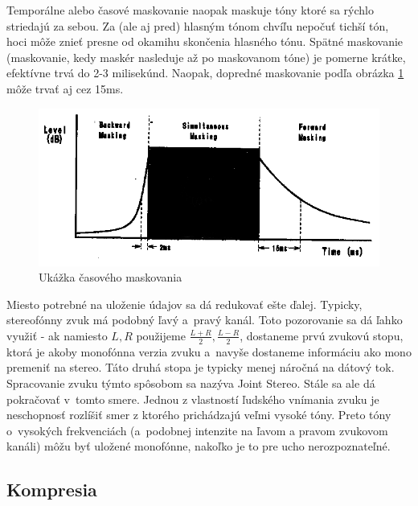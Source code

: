 Temporálne alebo časové maskovanie naopak maskuje tóny ktoré sa rýchlo
striedajú za sebou. Za (ale aj pred) hlasným tónom chvíľu nepočuť
tichší tón, hoci môže znieť presne od okamihu skončenia hlasného tónu.
Spätné maskovanie (maskovanie, kedy maskér nasleduje až po maskovanom
tóne) je pomerne krátke, efektívne trvá do 2-3 milisekúnd.
Naopak, dopredné maskovanie podľa obrázka \ref{fig:temporal_masking}
môže trvať aj cez 15ms.

\begin{figure}[htp]
    \centering
    \includegraphics{obrazky/informatika/audio/temporal_masking}
    \caption{Ukážka časového maskovania}
    \label{fig:temporal_masking}
\end{figure}

Miesto potrebné na uloženie údajov sa dá redukovať ešte ďalej.
Typicky, stereofónny zvuk má podobný ľavý a~pravý kanál. Toto
pozorovanie sa dá ľahko využiť - ak namiesto $L,R$ použijeme
$\frac{L+R}{2}, \frac{L-R}{2}$, dostaneme prvú zvukovú stopu, ktorá je
akoby monofónna verzia zvuku a~navyše dostaneme informáciu ako mono premeniť
na stereo. Táto druhá stopa je typicky menej náročná na dátový tok.
Spracovanie zvuku týmto spôsobom sa nazýva Joint Stereo.
Stále sa ale dá pokračovať v~tomto smere. Jednou z vlastností ľudského
vnímania zvuku je neschopnosť rozlíšiť smer z ktorého prichádzajú
veľmi vysoké tóny. Preto tóny o~vysokých frekvenciách (a~podobnej
intenzite na ľavom a pravom zvukovom kanáli) môžu byť uložené
monofónne, nakoľko je to pre ucho nerozpoznateľné.

\subsection{Kompresia}

